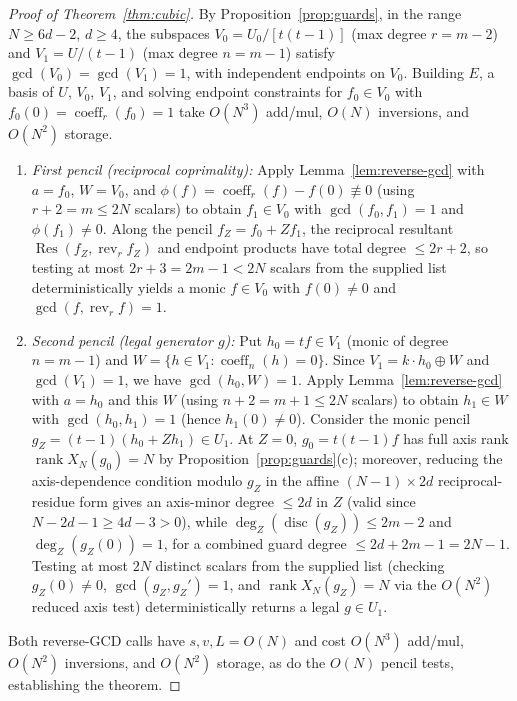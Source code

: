 \documentclass[11pt,reqno]{amsart}
\numberwithin{equation}{section}
\theoremstyle{definition}
\theoremstyle{remark}
\newcommand{\rank}{\operatorname{rank}}
\newcommand{\disc}{\operatorname{disc}}
\newcommand{\rev}{\operatorname{rev}}
\begin{document}
\begin{proof}[Proof of Theorem~\ref{thm:cubic}]
By Proposition~\ref{prop:guards}, in the range $N\ge 6d-2$, $d\ge 4$, the subspaces $V_0 = U_0/[t(t-1)]$ (max degree $r=m-2$) and $V_1 = U/(t-1)$ (max degree $n=m-1$) satisfy $\gcd(V_0)=\gcd(V_1)=1$, with independent endpoints on $V_0$. Building $E$, a basis of $U$, $V_0$, $V_1$, and solving endpoint constraints for $f_0\in V_0$ with $f_0(0)=\operatorname{coeff}_r(f_0)=1$ take $O(N^3)$ add/mul, $O(N)$ inversions, and $O(N^2)$ storage.
\begin{enumerate}[label=(\arabic*),leftmargin=2em]
\item \emph{First pencil (reciprocal coprimality):} Apply Lemma~\ref{lem:reverse-gcd} with $a=f_0$, $W=V_0$, and $\phi(f)=\operatorname{coeff}_r(f)-f(0)\not\equiv 0$ (using $r+2=m\le 2N$ scalars) to obtain $f_1\in V_0$ with $\gcd(f_0,f_1)=1$ and $\phi(f_1)\ne 0$. Along the pencil $f_Z = f_0 + Zf_1$, the reciprocal resultant $\operatorname{Res}(f_Z,\rev_r f_Z)$ and endpoint products have total degree $\le 2r+2$, so testing at most $2r+3 = 2m-1 < 2N$ scalars from the supplied list deterministically yields a monic $f\in V_0$ with $f(0)\ne 0$ and $\gcd(f,\rev_r f)=1$.
\item \emph{Second pencil (legal generator $g$):} Put $h_0=tf\in V_1$ (monic of degree $n=m-1$) and $W=\{h\in V_1 : \operatorname{coeff}_n(h)=0\}$. Since $V_1 = k\cdot h_0\oplus W$ and $\gcd(V_1)=1$, we have $\gcd(h_0,W)=1$. Apply Lemma~\ref{lem:reverse-gcd} with $a=h_0$ and this $W$ (using $n+2=m+1\le 2N$ scalars) to obtain $h_1\in W$ with $\gcd(h_0,h_1)=1$ (hence $h_1(0)\ne 0$). Consider the monic pencil $g_Z = (t-1)(h_0 + Zh_1)\in U_1$. At $Z=0$, $g_0=t(t-1)f$ has full axis rank $\rank X_N(g_0)=N$ by Proposition~\ref{prop:guards}(c); moreover, reducing the axis-dependence condition modulo $g_Z$ in the affine $(N-1)\times 2d$ reciprocal-residue form gives an axis-minor degree $\le 2d$ in $Z$ (valid since $N-2d-1\ge 4d-3>0$), while $\deg_Z(\disc(g_Z))\le 2m-2$ and $\deg_Z(g_Z(0))=1$, for a combined guard degree $\le 2d + 2m - 1 = 2N-1$. Testing at most $2N$ distinct scalars from the supplied list (checking $g_Z(0)\ne 0$, $\gcd(g_Z,g_Z')=1$, and $\rank X_N(g_Z)=N$ via the $O(N^2)$ reduced axis test) deterministically returns a legal $g\in U_1$.
\end{enumerate}
Both reverse-GCD calls have $s,v,L=O(N)$ and cost $O(N^3)$ add/mul, $O(N^2)$ inversions, and $O(N^2)$ storage, as do the $O(N)$ pencil tests, establishing the theorem.
\end{proof}
\end{document}

